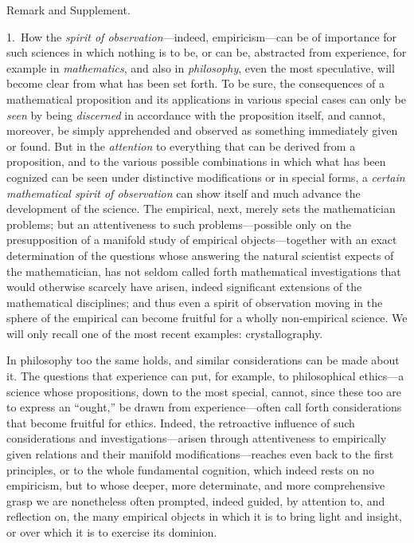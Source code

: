 \documentclass[12pt,a4paper]{book}
\begin{document}
\begin{center}Remark and Supplement.\end{center}
1.~How the \emph{spirit of observation}---indeed, empiricism---can be of importance for
such sciences in which nothing is to be, or can be, abstracted from experience, for example
in \emph{mathematics}, and also in \emph{philosophy}, even the most speculative, will become
clear from what has been set forth. To be sure, the consequences of a mathematical
proposition and its applications in various special cases can only be \emph{seen} by being
\emph{discerned} in accordance with the proposition itself, and cannot, moreover, be simply
apprehended and observed as something immediately given or found. But in the
\emph{attention} to everything that can be derived from a proposition, and to the various
possible combinations in which what has been cognized can be seen under distinctive
modifications or in special forms, a \emph{certain} \emph{mathematical spirit of observation} can show
itself and much advance the development of the science. The empirical, next, merely sets the
mathematician problems; but an attentiveness to such problems---possible only on the
presupposition of a manifold study of empirical objects---together with an exact
determination of the questions whose answering the natural scientist expects of the
mathematician, has not seldom called forth mathematical investigations that would otherwise
scarcely have arisen, indeed significant extensions of the mathematical disciplines; and
thus even a spirit of observation moving in the sphere of the empirical can become fruitful
for a wholly non-empirical science. We will only recall one of the most recent examples:
crystallography.

In philosophy too the same holds, and similar considerations can be made about it. The
questions that experience can put, for example, to philosophical ethics---a science
whose propositions, down to the most special, cannot, since these too are to express an
``ought,'' be drawn from experience---often call forth considerations that become fruitful
for ethics. Indeed, the retroactive influence of such considerations and
investigations---arisen through attentiveness to empirically given relations and their
manifold modifications---reaches even back to the first principles, or to the whole
fundamental cognition, which indeed rests on no empiricism, but to whose deeper, more
determinate, and more comprehensive grasp we are nonetheless often prompted, indeed guided,
by attention to, and reflection on, the many empirical objects in which it is to bring light
and insight, or over which it is to exercise its dominion.
\end{document}
